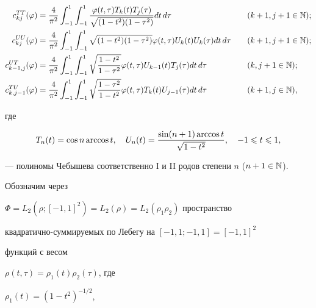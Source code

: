 \begin{alignat*}{2}


c_{kj}^{TT}(\vp) &= \frac{4}{\pi^2} \int_{-1}^{1} \int_{-1}^{1}


\frac{\vp(t,\tau)T_k(t)T_j(\tau)}{\sqrt{(1-t^2)(1-\tau^2)}}dt\,d\tau


& \quad &(k+1,j+1\in\N); \\


%


c_{kj}^{UU}(\vp) &= \frac{4}{\pi^2} \int_{-1}^{1}\int_{-1}^{1}


\sqrt{(1-t^2)(1-\tau^2)}\vp(t,\tau) U_k(t) U_k(\tau) dt\,d\tau &\quad


&(k+1,j+1\in\N); \\


%


c_{k-1,j}^{UT}(\vp) &= \frac{4}{\pi^2}\int_{-1}^{1}\int_{-1}^{1}


\sqrt{\frac{1-t^2}{1-\tau^2}}\vp(t,\tau)U_{k-1}(t)T_j(\tau)dt\,d\tau


&\quad &(k, j+1\in\N); \\


%


c_{k,j-1}^{TU}(\vp) &= \frac{4}{\pi^2}\int_{-1}^{1}\int_{-1}^{1}


\sqrt{\frac{1-\tau^2}{1-t^2}}\vp(t,\tau)T_k(t)U_{j-1}(\tau)dt\,d\tau


&\quad &(k+1, j\in\N),


\end{alignat*}


где


$$


T_n(t) = \cos n \arccos t,\quad


U_n(t) = \frac{\sin(n+1)\arccos t}{\sqrt{1-t^2}},\quad -1\lea t \lea 1,


$$


--- полиномы Чебышева соответственно I и II родов степени $n$ ($n+1\in\Bbb N$).





Обозначим через 


$\Phi = L_2(\rho;[-1,1]^2) = L_2(\rho) = L_2(\rho_1\rho_2)$ пространство 


квадратично-сум\-ми\-ру\-е\-мых по Лебегу на $[-1,1;-1,1]=[-1,1]^2$ 


функций с весом 


$\rho(t,\tau) = \rho_1(t)\rho_2(\tau)$, где 


$\rho_1(t)= (1-t^2)^{-1/2}$,


